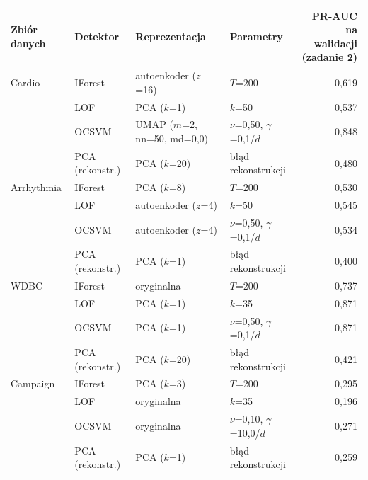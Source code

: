 \begin{tabular}{llllr}
\toprule
Zbiór danych & Detektor & Reprezentacja & Parametry & \makecell[r]{PR-AUC na walidacji\\(zadanie 2)} \\
\midrule
Cardio & IForest & autoenkoder ($z$=16) & $T$=200 & 0,619 \\
 & LOF & PCA ($k$=1) & $k$=50 & 0,537 \\
 & OCSVM & UMAP ($m$=2, nn=50, md=0,0) & $\nu$=0,50, $\gamma$=0,1/$d$ & 0,848 \\
 & PCA (rekonstr.) & PCA ($k$=20) & błąd rekonstrukcji & 0,480 \\
Arrhythmia & IForest & PCA ($k$=8) & $T$=200 & 0,530 \\
 & LOF & autoenkoder ($z$=4) & $k$=50 & 0,545 \\
 & OCSVM & autoenkoder ($z$=4) & $\nu$=0,50, $\gamma$=0,1/$d$ & 0,534 \\
 & PCA (rekonstr.) & PCA ($k$=1) & błąd rekonstrukcji & 0,400 \\
WDBC & IForest & oryginalna & $T$=200 & 0,737 \\
 & LOF & PCA ($k$=1) & $k$=35 & 0,871 \\
 & OCSVM & PCA ($k$=1) & $\nu$=0,50, $\gamma$=0,1/$d$ & 0,871 \\
 & PCA (rekonstr.) & PCA ($k$=20) & błąd rekonstrukcji & 0,421 \\
Campaign & IForest & PCA ($k$=3) & $T$=200 & 0,295 \\
 & LOF & oryginalna & $k$=35 & 0,196 \\
 & OCSVM & oryginalna & $\nu$=0,10, $\gamma$=10,0/$d$ & 0,271 \\
 & PCA (rekonstr.) & PCA ($k$=1) & błąd rekonstrukcji & 0,259 \\
\bottomrule
\end{tabular}

